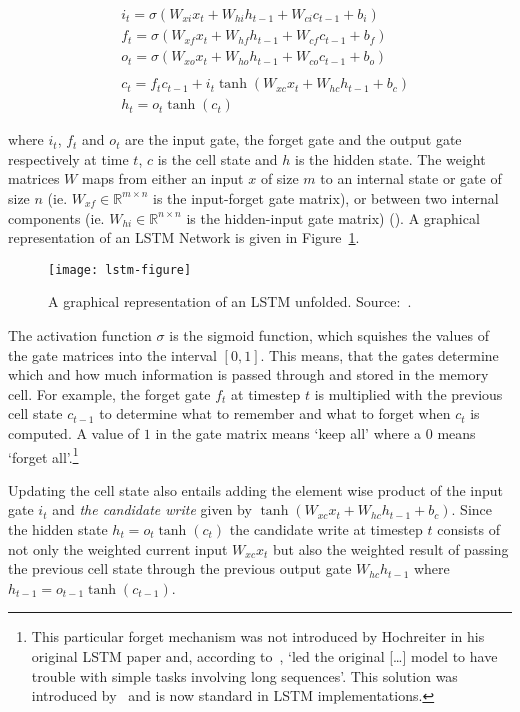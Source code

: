 \begin{align*}
    & i_{t} = \sigma(W_{xi}x_{t} + W_{hi}h_{t-1} + W_{ci}c_{t-1} + b_{i})    \\
    & f_{t} = \sigma(W_{xf}x_{t} + W_{hf}h_{t-1} + W_{cf}c_{t-1} + b_{f})    \\
    & o_{t} = \sigma(W_{xo}x_{t} + W_{ho}h_{t-1} + W_{co}c_{t-1} + b_{o})    \\ \\
    & c_{t} = f_{t}c_{t-1} + i_{t}\tanh(W_{xc}x_{t} + W_{hc}h_{t-1} + b_{c}) \\
    & h_{t} = o_{t}\tanh(c_{t})
\end{align*}

where $i_{t}$, $f_{t}$ and $o_{t}$ are the input gate, the forget gate and the
output gate respectively at time $t$, $c$ is the cell state and $h$ is the
hidden state. The weight matrices $W$ maps from either an input $x$ of size $m$
to an internal state or gate of size $n$ (ie. $W_{xf} \in \mathbb{R}^{m \times
n}$ is the input-forget gate matrix), or between two internal components (ie.
$W_{hi} \in \mathbb{R}^{n \times n}$ is the hidden-input gate matrix)
(\cite{huang2015bidirectional}). A graphical representation of an LSTM Network
is given in Figure~\ref{fig:lstm}.

\begin{figure}[h]
    \texttt{[image: lstm-figure]}
    \caption{A graphical representation of an LSTM unfolded. Source:~\cite{olah2015lstm}.
    }\label{fig:lstm}
\end{figure}

The activation function $\sigma$ is the sigmoid function, which squishes the
values of the gate matrices into the interval $[0,1]$. This means, that the
gates determine which and how much information is passed through and stored in
the memory cell. For example, the forget gate $f_{t}$ at timestep $t$ is
multiplied with the previous cell state $c_{t-1}$ to determine what to remember
and what to forget when $c_{t}$ is computed. A value of $1$ in the gate matrix
means `keep all' where a $0$ means `forget all'.\footnote{This particular forget
    mechanism was not introduced by Hochreiter in his original LSTM paper and,
    according to~\cite{pitis2016lstm}, `led the original [\ldots] model to have
    trouble with simple tasks involving long sequences'. This solution was
    introduced by~\cite{gers1999learning} and is now standard in LSTM
implementations.}

Updating the cell state also entails adding the element wise product of the
input gate $i_{t}$ and \textit{the candidate write} given by $\tanh(W_{xc}x_{t}
+ W_{hc}h_{t-1} + b_{c})$. Since the hidden state $h_{t} = o_{t}\tanh(c_{t})$
the candidate write at timestep $t$ consists of not only the weighted current
input $W_{xc}x_{t}$ but also the weighted result of passing the previous cell
state through the previous output gate $W_{hc}h_{t-1}$ where $h_{t-1} =
o_{t-1}\tanh(c_{t-1})$.


